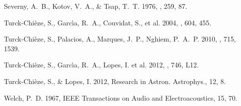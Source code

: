 \documentclass[bibyear]{aa}
\begin{document}
\begin{thebibliography}{}
   Severny, A.~B., Kotov, V.~A., \& Tsap, T.~T.  1976, {\nat}, 259, 87.

    Turck-Chi\`eze, S., Garc{\'{\i}}a, R.~A., Couvidat, S.,  et al. 2004, {\apj}, 604, 455.
     
      Turck-Chi\`eze, S., Palacios, A., Marques, J.~P., Nghiem, P.~A.~P. 2010, {\apj}, 715, 1539.

     Turck-Chi\`eze, S., Garc{\'{\i}}a, R.~A., {Lopes}, I. et al. 2012, {\apjl}, 746, L12. 

     Turck-Chi\`eze, S., \& Lopes, I. 2012, Research in Astron. Astrophys., 12, 8.

 Welch, P.~D. 1967, IEEE Transactions on Audio and Electroacoustics, 15, 70.

\end{thebibliography}
\end{document}
